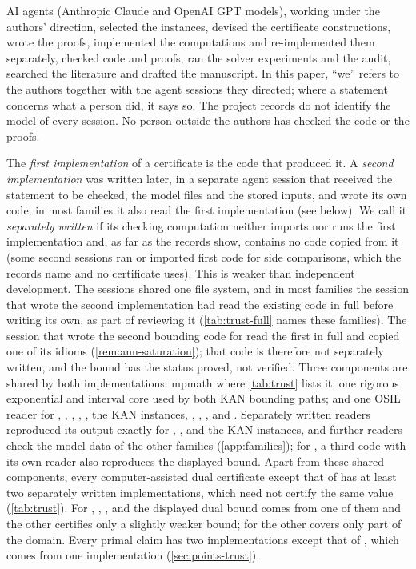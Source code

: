 AI agents (Anthropic Claude and OpenAI GPT models), working under the authors' direction, selected the instances, devised the certificate constructions, wrote the proofs, implemented the computations and re-implemented them separately, checked code and proofs, ran the solver experiments and the audit, searched the literature and drafted the manuscript.
In this paper, ``we'' refers to the authors together with the agent sessions they directed; where a statement concerns what a person did, it says so.
The project records do not identify the model of every session.
No person outside the authors has checked the code or the proofs.

The \emph{first implementation} of a certificate is the code that produced it.
A \emph{second implementation} was written later, in a separate agent session that received the statement to be checked, the model files and the stored inputs, and wrote its own code; in most families it also read the first implementation (see below).
We call it \emph{separately written} if its checking computation neither imports nor runs the first implementation and, as far as the records show, contains no code copied from it (some second sessions ran or imported first code for side comparisons, which the records name and no certificate uses).
This is weaker than independent development.
The sessions shared one file system, and in most families the session that wrote the second implementation had read the existing code in full before writing its own, as part of reviewing it (\cref{tab:trust-full} names these families).
The session that wrote the second bounding code for  read the first in full and copied one of its idioms (\cref{rem:ann-saturation}); that code is therefore not separately written, and the  bound has the status proved, not verified.
Three components are shared by both implementations: mpmath where \cref{tab:trust} lists it; one rigorous exponential and interval core used by both KAN bounding paths; and one OSIL reader for , , , , , the KAN instances, , , ,  and .
Separately written readers reproduced its output exactly for , ,  and the KAN instances, and further readers check the model data of the other families (\cref{app:families}); for , a third code with its own reader also reproduces the displayed bound.
Apart from these shared components, every computer-assisted dual certificate except that of  has at least two separately written implementations, which need not certify the same value (\cref{tab:trust}).
For , , ,  and  the displayed dual bound comes from one of them and the other certifies only a slightly weaker bound; for  the other covers only part of the domain.
Every primal claim has two implementations except that of , which comes from one implementation (\cref{sec:points-trust}).


